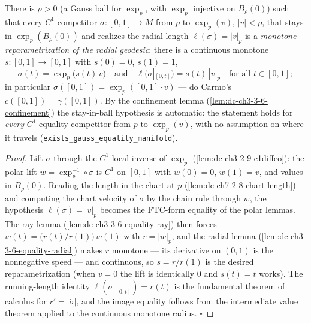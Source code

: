 \begin{lemma}
  \label{lem:dc-ch3-3-6-equality-manifold}
  \leanok
  There is $\rho>0$ (a Gauss ball for $\exp_p$, with $\exp_p$ injective on
  $B_\rho(0)$) such that every $C^1$ competitor $\sigma:[0,1]\to M$ from $p$
  to $\exp_p(v)$, $|v|<\rho$, that stays in $\exp_p(B_\rho(0))$ and realizes
  the radial length $\ell(\sigma)=|v|_p$ is a \emph{monotone reparametrization
  of the radial geodesic}: there is a continuous monotone
  $s:[0,1]\to[0,1]$ with $s(0)=0$, $s(1)=1$,
  $$\sigma(t)=\exp_p\big(s(t)\,v\big)\quad\text{and}\quad
    \ell\big(\sigma|_{[0,t]}\big)=s(t)\,|v|_p\quad\text{for all }t\in[0,1];$$
  in particular $\sigma([0,1])=\exp_p([0,1]\cdot v)$ — do Carmo's
  $c([0,1])=\gamma([0,1])$. By the confinement lemma
  (\cref{lem:dc-ch3-3-6-confinement}) the stay-in-ball hypothesis is
  automatic: the statement holds for \emph{every} $C^1$ equality competitor
  from $p$ to $\exp_p(v)$, with no assumption on where it travels
  (\texttt{exists\_gauss\_equality\_manifold}).
\end{lemma}
\begin{proof}
  \leanok
  Lift $\sigma$ through the $C^1$ local inverse of $\exp_p$
  (\cref{lem:dc-ch3-2-9-c1diffeo}): the polar lift
  $w=\exp_p^{-1}\circ\sigma$ is $C^1$ on $[0,1]$ with $w(0)=0$, $w(1)=v$, and
  values in $B_\rho(0)$. Reading the length in the chart at $p$
  (\cref{lem:dc-ch7-2-8-chart-length}) and computing the chart velocity of
  $\sigma$ by the chain rule through $w$, the hypothesis
  $\ell(\sigma)=|v|_p$ becomes the FTC-form equality of the polar lemmas.
  The ray lemma (\cref{lem:dc-ch3-3-6-equality-ray}) then forces
  $w(t)=\big(r(t)/r(1)\big)\,w(1)$ with $r=|w|_p$, and the radial lemma
  (\cref{lem:dc-ch3-3-6-equality-radial}) makes $r$ monotone — its derivative
  on $(0,1)$ is the nonnegative speed — and continuous, so
  $s=r/r(1)$ is the desired reparametrization (when $v=0$ the lift is
  identically $0$ and $s(t)=t$ works). The running-length identity
  $\ell(\sigma|_{[0,t]})=r(t)$ is the fundamental theorem of calculus for
  $r'=|\dot\sigma|$, and the image equality follows from the intermediate
  value theorem applied to the continuous monotone radius. $\square$
\end{proof}

